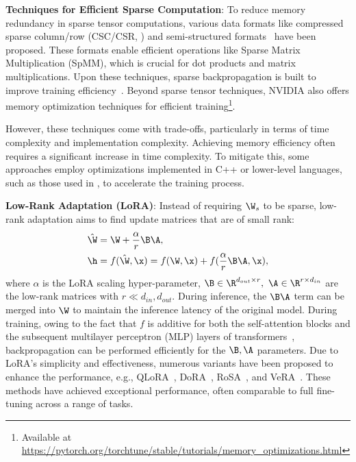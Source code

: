 \textbf{Techniques for Efficient Sparse Computation}: To reduce memory redundancy in sparse tensor computations, various data formats like compressed sparse column/row (CSC/CSR, \citealp{mofrad2019multithreaded, lu2024spp}) and semi-structured formats~\citep{holmes2021nxmtransformer} have been proposed. These formats enable efficient operations like Sparse Matrix Multiplication (SpMM), which is crucial for dot products and matrix multiplications. Upon these techniques, sparse backpropagation is built to improve training efficiency~\citep{zhang2020sparch, gale2020sparse, peste2021ac, schwarz2021powerpropagation, hoefler2021sparsity,jiang2022exposing, pmlr-v202-nikdan23a, xu2024survey}. Beyond sparse tensor techniques, NVIDIA also offers memory optimization techniques for efficient training\footnote{Available at \url{https://pytorch.org/torchtune/stable/tutorials/memory_optimizations.html}}.

However, these techniques come with trade-offs, particularly in terms of time complexity and implementation complexity. Achieving memory efficiency often requires a significant increase in time complexity. To mitigate this, some approaches employ optimizations implemented in C++ or lower-level languages, such as those used in \citep{gale2020sparse, pmlr-v202-nikdan23a, nikdan2024rosa}, to accelerate the training process. 

\textbf{Low-Rank Adaptation (LoRA)}: Instead of requiring $\W_s$ to be sparse, low-rank adaptation aims to find update matrices that are of small rank:
\begin{align}
    & \hat{\W}=\W + \frac{\alpha}{r}\B\A \label{eq:lora_w}, \\
    & \h = f(\hat{\W}, \x) = f(\W, \x) + f(\frac{\alpha}{r}\B\A, \x), \label{eq:lora_fwd}
\end{align}
where $\alpha$ is the LoRA scaling hyper-parameter, \iffalse $r$ is the middle dimensionality of the low-rank matrices, \fi$\B\in \R^{d_{out}\times r},\ \A\in \R^{r\times d_{in}}$ are the low-rank matrices with $r\ll d_{in},d_{out}$. During inference, the $\B \A$ term can be merged into $\W$ to maintain the inference latency of the original model. During training, owing to the fact that $f$ is additive for both the self-attention blocks and the subsequent multilayer perceptron (MLP) layers of transformers~\citep{vaswani2017attention}, backpropagation can be performed efficiently for the $\B, \A$ parameters. Due to LoRA's simplicity and effectiveness, numerous variants have been proposed to enhance the performance, e.g., QLoRA~\citep{dettmers2022gpt3,guo2024lqlora,li2024loftq,dettmers2024qlora}, DoRA~\citep{liu2024dora}, RoSA~\citep{nikdan2024rosa}, and VeRA~\citep{kopiczko2024vera}. %
These methods have achieved exceptional performance, often comparable to full fine-tuning across a range of tasks.

